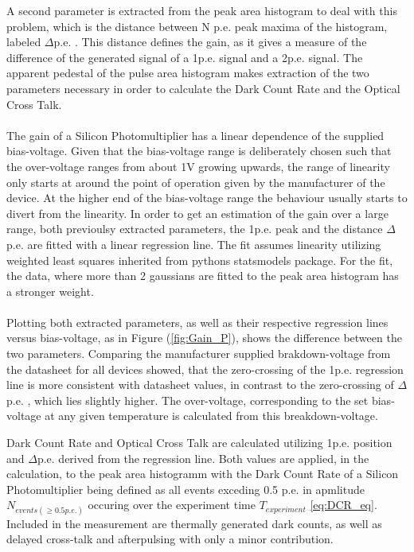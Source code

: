 \documentclass[12pt,article,type=msc,colorback,accentcolor=tud9c]{tudthesis}
\begin{document}
A second parameter is extracted from the peak area histogram to deal with this problem, which is the distance between N p.e. peak maxima of the histogram, labeled $\Delta$p.e. . This distance defines the gain, as it gives a measure of the difference of the generated signal of a 1p.e. signal and a 2p.e. signal. The apparent pedestal of the pulse area histogram makes extraction of the two parameters necessary in order to calculate the Dark Count Rate and the Optical Cross Talk.\\\\ The gain of a Silicon Photomultiplier has a linear dependence of the supplied bias-voltage. Given that the bias-voltage range is deliberately chosen such that the over-voltage ranges from about 1V growing upwards, the range of linearity only starts at around the point of operation given by the manufacturer of the device. At the higher end of the bias-voltage range the behaviour usually starts to divert from the linearity. In order to get an estimation of the gain over a large range, both previoulsy extracted parameters, the 1p.e. peak and the distance $\Delta$p.e. are fitted with a linear regression line. The fit assumes linearity utilizing weighted least squares inherited from pythons statsmodels package. For the fit, the data, where more than 2 gaussians are fitted to the peak area histogram has a stronger weight.\\\\ Plotting both extracted parameters, as well as their respective regression lines versus bias-voltage, as in Figure (\ref{fig:Gain_P}), shows the difference between the two parameters. Comparing the manufacturer supplied brakdown-voltage from the datasheet for all devices showed, that the zero-crossing of the 1p.e. regression line is more consistent with datasheet values, in contrast to the zero-crossing of $\Delta$p.e. , which lies slightly higher. The over-voltage, corresponding to the set bias-voltage at any given temperature is calculated from this breakdown-voltage. 


Dark Count Rate and Optical Cross Talk are calculated utilizing 1p.e. position and $\Delta$p.e. derived from the regression line. Both values are applied, in the calculation, to the peak area histogramm with the Dark Count Rate of a Silicon Photomultiplier being defined as all events exceding 0.5 p.e. in apmlitude $N_{events(\geq 0.5p.e.)}$ occuring over the experiment time $T_{experiment}$ \ref{eq:DCR_eq}. Included in the measurement are thermally generated dark counts, as well as delayed cross-talk and afterpulsing with only a minor contribution.
\end{document}
